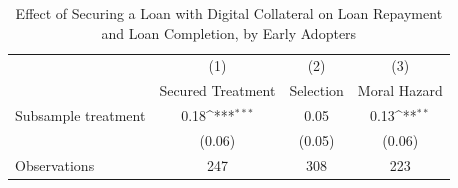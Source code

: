 \begin{table}[htbp]\centering
\def\sym#1{\ifmmode^{#1}\else\(^{#1}\)\fi}
\caption{Effect of Securing a Loan with Digital Collateral on Loan Repayment and Loan Completion, by Early Adopters\label{LASMH\_repay\_earlyadopt\_ITT\_150}}
\begin{tabular}{l*{3}{c}}
\toprule
                    &\multicolumn{1}{c}{(1)}&\multicolumn{1}{c}{(2)}&\multicolumn{1}{c}{(3)}\\
                    &\multicolumn{1}{c}{Secured Treatment}&\multicolumn{1}{c}{Selection}&\multicolumn{1}{c}{Moral Hazard}\\
\midrule
Subsample treatment &        0.18\sym{***}&        0.05         &        0.13\sym{**} \\
                    &      (0.06)         &      (0.05)         &      (0.06)         \\
\midrule
Observations        &         247         &         308         &         223         \\
\bottomrule
\end{tabular}
\end{table}
